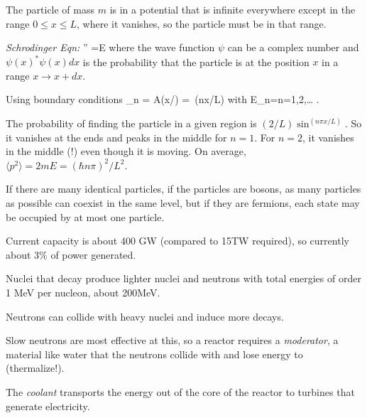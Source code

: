 \documentclass[11pt]{book}
\begin{document}
The particle of mass $m$ is in a potential that is infinite everywhere except in the range $0\le x\le L$, where it vanishes, so the particle must be in that range. 
\bee
\item {\it Schrodinger Eqn:}
\be
{} \psi'' =E\psi
\ee
where the wave function $\psi$ can be a complex number and $\psi(x)^*\psi(x) dx$ is the probability that the particle is at the position $x$ in a range $x\rightarrow x+dx$. 
\item
Using boundary conditions
\be
\psi_n = A\sin(x/\hbar) = \,\sin(n\pi x/L)
\ee
with 
\be
E_n=\qquad n=1,2,\ldots
.\ee
\item The probability of finding the particle in a given region is $(2/L) \sin^(n\pi x/L)$. So it vanishes at the ends and peaks in the middle for $n=1$. For $n=2$, it vanishes in the middle (!) even though it is moving. On average, $\langle p^2\rangle = 2mE = (\hbar n\pi)^2/L^2$.
\item If there are many identical particles, if the particles are bosons, as many particles as possible can coexist in the same level, but if they are fermions, each state may be occupied by at most one particle.
\eee
{}



%
%

\bei
\item Current capacity is about 400 GW (compared to 15TW required), so currently about 3\% of power generated.
\item Nuclei that decay produce lighter nuclei and neutrons with total energies of order 1 MeV per nucleon, about 200MeV. 
\item Neutrons can collide with heavy nuclei and induce more decays. 
\item Slow neutrons are most effective at this, so a reactor requires a {\it moderator}, a material like water that the neutrons collide with and lose energy to (thermalize!). 
\item The {\it coolant} transports the energy out of the core of the reactor to turbines that generate electricity.
\eei
\end{document}
